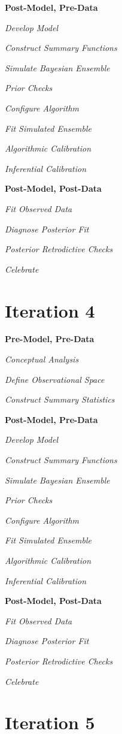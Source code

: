 \documentclass[11pt, oneside, openany]{scrbook}
\begin{document}
\textbf{Post-Model, Pre-Data}

\emph{Develop Model}

\emph{Construct Summary Functions}

\emph{Simulate Bayesian Ensemble}

\emph{Prior Checks}

\emph{Configure Algorithm}

\emph{Fit Simulated Ensemble}

\emph{Algorithmic Calibration}

\emph{Inferential Calibration}

\textbf{Post-Model, Post-Data}

\emph{Fit Observed Data}

\emph{Diagnose Posterior Fit}

\emph{Posterior Retrodictive Checks}

\emph{Celebrate}

\hypertarget{iter4}{%
\section{Iteration 4}\label{iter4}}

\textbf{Pre-Model, Pre-Data}

\emph{Conceptual Analysis}

\emph{Define Observational Space}

\emph{Construct Summary Statistics}

\textbf{Post-Model, Pre-Data}

\emph{Develop Model}

\emph{Construct Summary Functions}

\emph{Simulate Bayesian Ensemble}

\emph{Prior Checks}

\emph{Configure Algorithm}

\emph{Fit Simulated Ensemble}

\emph{Algorithmic Calibration}

\emph{Inferential Calibration}

\textbf{Post-Model, Post-Data}

\emph{Fit Observed Data}

\emph{Diagnose Posterior Fit}

\emph{Posterior Retrodictive Checks}

\emph{Celebrate}

\hypertarget{iter5}{%
\section{Iteration 5}\label{iter5}}
\end{document}
